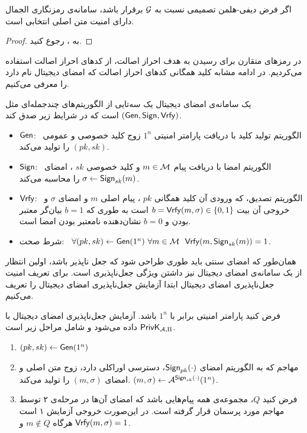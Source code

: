 \begin{theorem}
	اگر فرض دیفی-هلمن تصمیمی نسبت به 
	${\mathcal G}$
	برقرار باشد، سامانه‌ی رمزنگاری الجمال دارای امنیت متن اصلی انتخابی است.
\begin{proof}
	به 
	{\small \cite[ص.$402$]{katz2014introduction}}، 
	رجوع کنید. 
\end{proof}
\end{theorem}
در رمزهای متقارن برای رسیدن به هدف احراز اصالت، از کدهای احراز اصالت استفاده می‌کردیم. در ادامه مشابه کلید همگانی کدهای احراز اصالت که امضای دیجیتال نام دارد را معرفی می‌کنیم. 

\begin{definition}
یک سامانه‌ی امضای دیجیتال یک سه‌تایی از الگوریتم‌های چندجمله‌ای مثل 
$(\mathsf{Gen}, \mathsf{Sign}, \mathsf{Vrfy})$
است که در شرایط زیر صدق کند. 
\begin{itemize}
\item
$\mathsf{Gen}$: \  
الگوریتم تولید کلید با دریافت پارامتر امنیتی 
$1^{n}$
 زوج کلید خصوصی و عمومی 
 $(pk, sk)$
 را تولید می‌کند. 
 \item 
 $\mathsf{Sign}$:  \ 
الگوریتم امضا با دریافت پیام 
$m\in{\mathcal M}$ 
و کلید خصوصی 
$sk$
، امضای 
$\sigma \gets \mathsf{Sign}_{sk}(m)$
را محاسبه می‌کند. 
\item 
$\mathsf{Vrfy}$:  \ 
الگوریتم تصدیق، که ورودی آن کلید همگانی 
$pk$
، پیام اصلی 
$m$
و امضای 
$\sigma$
و خروجی آن بیت 
$b = \mathsf{Vrfy}(m , \sigma)\in \{0, 1\}$
است به طوری که 
$b = 1$
بیان‌گر معتبر بودن و 
$b = 0$
نشان‌دهنده‌ نامعتبر بودن امضا است. 
\item
شرط صحت: \ 
$\forall (pk, sk)\gets\mathsf{Gen}(1^{n}) \ \forall m\in{\mathcal M} \ \ \mathsf{Vrfy}(m, \mathsf{Sign}_{sk}(m)) = 1$.
\end{itemize}
\end{definition}

همان‌طور که امضای سنتی باید طوری طراحی شود که جعل ناپذیر باشد، اولین انتظار از یک سامانه‌ی امضای دیجیتال نیز داشتن ویژگی جعل‌ناپذیری است. برای تعریف امنیت جعل‌ناپذیری امضای دیجیتال ابتدا آزمایش جعل‌ناپذیری امضای دیجیتال را تعریف می‌کنیم. 
\begin{definition}[\textbf{آزمایش جعل‌ناپذیری امضای دیجیتال}]
	فرض کنید پارامتر امنیتی برابر با 
$1^{n}$
باشد. آزمایش جعل‌ناپذیری امضای دیجیتال  با 
$\mathsf{PrivK}_{\mathcal{A},\Pi}$
داده می‌شود و شامل مراحل زیر است. 
\begin{enumerate}
\item 
$(pk, sk)\gets \mathsf{Gen}(1^{n})$
\item 
مهاجم که به الگوریتم امضای 
$\mathsf{Sign}_{pk}(\cdot)$، 
 دسترسی اوراکلی دارد، زوج متن اصلی و امضای 
$(m, \sigma)$
را تولید می‌کند. 
$(m, \sigma)\gets \mathcal{A}^{\mathsf{Sign}_{sk}(\cdot)}(1^{n})$. 
\item
فرض کنید 
$Q$، 
مجموعه‌ی همه پیام‌هایی باشد که امضای آن‌ها در مرحله‌ی ۲ توسط مهاجم مورد پرسمان قرار گرفته است. در این‌صورت خروجی آزمایش ۱ است هرگاه 
$m\notin Q$
و
$\mathsf{Vrfy}(m, \sigma) = 1$.
\end{enumerate}
\end{definition}

